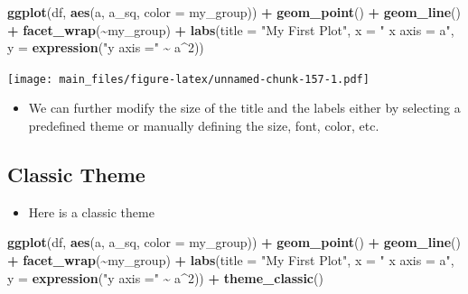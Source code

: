\documentclass[
]{book}
\newenvironment{Shaded}{\begin{snugshade}}{\end{snugshade}}
\newcommand{\AttributeTok}[1]{\textcolor[rgb]{0.13,0.29,0.53}{#1}}
\newcommand{\DecValTok}[1]{\textcolor[rgb]{0.00,0.00,0.81}{#1}}
\newcommand{\FunctionTok}[1]{\textcolor[rgb]{0.13,0.29,0.53}{\textbf{#1}}}
\newcommand{\NormalTok}[1]{#1}
\newcommand{\SpecialCharTok}[1]{\textcolor[rgb]{0.81,0.36,0.00}{\textbf{#1}}}
\newcommand{\StringTok}[1]{\textcolor[rgb]{0.31,0.60,0.02}{#1}}
\providecommand{\tightlist}{%
  \setlength{\itemsep}{0pt}\setlength{\parskip}{0pt}}
\begin{document}
\begin{Shaded}
\begin{Highlighting}[]
\FunctionTok{ggplot}\NormalTok{(df, }\FunctionTok{aes}\NormalTok{(a, a\_sq, }\AttributeTok{color =}\NormalTok{ my\_group)) }\SpecialCharTok{+} \FunctionTok{geom\_point}\NormalTok{()  }\SpecialCharTok{+} \FunctionTok{geom\_line}\NormalTok{() }\SpecialCharTok{+} \FunctionTok{facet\_wrap}\NormalTok{(}\SpecialCharTok{\textasciitilde{}}\NormalTok{my\_group) }\SpecialCharTok{+}
  \FunctionTok{labs}\NormalTok{(}\AttributeTok{title =} \StringTok{"My First Plot"}\NormalTok{, }\AttributeTok{x =} \StringTok{" x axis = a"}\NormalTok{, }\AttributeTok{y =} \FunctionTok{expression}\NormalTok{(}\StringTok{"y axis ="} \SpecialCharTok{\textasciitilde{}}\NormalTok{ a}\SpecialCharTok{\^{}}\DecValTok{2}\NormalTok{))}
\end{Highlighting}
\end{Shaded}

\texttt{[image: main\_files/figure-latex/unnamed-chunk-157-1.pdf]}

\begin{itemize}
\tightlist
\item
  We can further modify the size of the title and the labels either by selecting a predefined theme or manually defining the size, font, color, etc.
\end{itemize}

\subsection{Classic Theme}\label{classic-theme}

\begin{itemize}
\tightlist
\item
  Here is a classic theme
\end{itemize}

\begin{Shaded}
\begin{Highlighting}[]
\FunctionTok{ggplot}\NormalTok{(df, }\FunctionTok{aes}\NormalTok{(a, a\_sq, }\AttributeTok{color =}\NormalTok{ my\_group)) }\SpecialCharTok{+} \FunctionTok{geom\_point}\NormalTok{()  }\SpecialCharTok{+} \FunctionTok{geom\_line}\NormalTok{() }\SpecialCharTok{+} \FunctionTok{facet\_wrap}\NormalTok{(}\SpecialCharTok{\textasciitilde{}}\NormalTok{my\_group) }\SpecialCharTok{+}
  \FunctionTok{labs}\NormalTok{(}\AttributeTok{title =} \StringTok{"My First Plot"}\NormalTok{, }\AttributeTok{x =} \StringTok{" x axis = a"}\NormalTok{, }\AttributeTok{y =} \FunctionTok{expression}\NormalTok{(}\StringTok{"y axis ="} \SpecialCharTok{\textasciitilde{}}\NormalTok{ a}\SpecialCharTok{\^{}}\DecValTok{2}\NormalTok{)) }\SpecialCharTok{+}
  \FunctionTok{theme\_classic}\NormalTok{()}
\end{Highlighting}
\end{Shaded}
\end{document}
